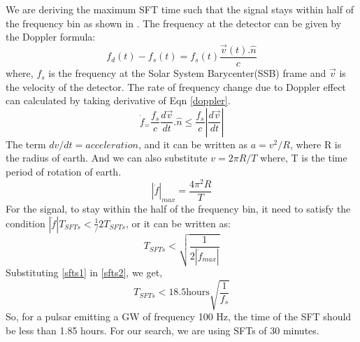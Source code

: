 \documentclass{ttuthes2007}
\begin{document}
We are deriving the maximum \ac{SFT} time such that the signal stays within half
of the frequency bin as shown in \cite{Krishnan_2004}. The frequency at the detector can be given by the Doppler formula:
\begin{equation}
\label{doppler}
f_d(t) - f_s(t) = f_s(t)\frac{\vec{v}(t).\hat{n}}{c}
\end{equation}
where, $f_s$ is the frequency at the Solar System Barycenter(SSB) frame and
$\vec{v}$ is the velocity of the detector.
The rate of frequency change due to Doppler effect can calculated by taking
derivative of Eqn \ref{doppler}.
\begin{equation}
\dot{f}_= \frac{f_s}{c}\frac{d\vec{v}}{dt}.\hat{n} \leq
\frac{f_s}{c}\left|\frac{d\vec{v}}{dt}\right|
\end{equation}
The term $dv/dt=acceleration$, and it can be written as $a=v^2/R$, where R is
the radius of earth. And we can also substitute $v=2\pi R/T$ where, T is the time
period of rotation of earth.
\begin{equation}\label{sfts1}
|\dot{f}|_{max}= \frac{4\pi^2R}{T}
\end{equation}
For the signal, to stay within the half of the frequency bin, it need to satisfy
the condition $|\dot{f}|T_{SFTs} < \frac{1}/{2T_{SFTs}}$, or it can be written as:
\begin{equation}\label{sfts2}
T_{SFTs}<\sqrt{\frac{1}{2|\dot{f}_{max}|}}
\end{equation}
Substituting \ref{sfts1} in \ref{sfts2}, we get,
\begin{equation}
T_{SFTs} < 18.5 \text{hours}\sqrt{\frac{1}{f_s}}
\end{equation}
So, for a pulsar emitting a \ac{GW} of frequency 100 Hz, the time of the
\ac{SFT} should be less than 1.85 hours. For our search, we are using \acp{SFT} of 30 minutes.
\end{document}
